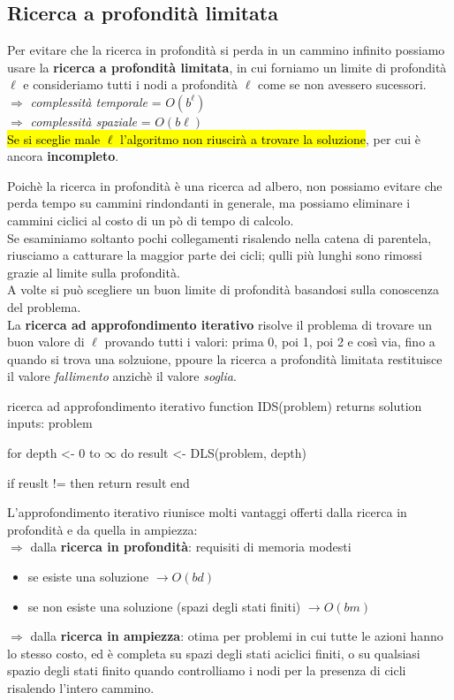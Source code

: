 \documentclass[12pt, a4paper, oneside]{book}
\begin{document}
    \subsection{Ricerca a profondità limitata}
    Per evitare che la ricerca in profondità si perda in un cammino infinito possiamo usare la \textbf{ricerca a profondità limitata}, in cui forniamo un limite di profondità $\ell$ e consideriamo tutti i nodi a profondità $\ell$ come se non avessero sucessori. \\[0.2ex]
    $\Rightarrow$ \textit{complessità temporale} = $O(b^\ell)$ \\[0.2ex]
    $\Rightarrow$ \textit{complessità spaziale} = $O(b\ell)$ \\[0.2ex]
    \hl{Se si sceglie male $\ell$ l'algoritmo non riuscirà a trovare la soluzione}, per cui è ancora \textbf{incompleto}.

    Poichè la ricerca in profondità è una ricerca ad albero, non possiamo evitare che perda tempo su cammini rindondanti in generale, ma possiamo eliminare i cammini ciclici al costo di un pò di tempo di calcolo. \\[0.2ex]
    Se esaminiamo soltanto pochi collegamenti risalendo nella catena di parentela, riusciamo a catturare la maggior parte dei cicli; qulli più lunghi sono rimossi grazie al limite sulla profondità. \\[0.2ex]
    A volte si può scegliere un buon limite di profondità basandosi sulla conoscenza del problema. \\[5ex]

    La \textbf{ricerca ad approfondimento iterativo} risolve il problema di trovare un buon valore di $\ell$ provando tutti i valori: prima 0, poi 1, poi 2 e così via, fino a quando si trova una solzuione, ppoure la ricerca a profondità limitata restituisce il valore \textit{fallimento} anzichè il valore \textit{soglia}.

    \begin{codice}[python]{ricerca ad approfondimento iterativo}
      function IDS(problem) returns solution
        inputs: problem

        for depth <- 0 to $\infty$ do
          result <- DLS(problem, depth)

          if reuslt != then return result
        end
    \end{codice}

    L'approfondimento iterativo riunisce molti vantaggi offerti dalla ricerca in profondità e da quella in ampiezza: \\[0.2ex]
    $\Rightarrow$ dalla \textbf{ricerca in profondità}: requisiti di memoria modesti
    \begin{itemize}
      \item se esiste una soluzione $\rightarrow O(bd)$
      \item se non esiste una soluzione (spazi degli stati finiti) $\rightarrow O(bm)$
    \end{itemize}
    $\Rightarrow$ dalla \textbf{ricerca in ampiezza}: otima per problemi in cui tutte le azioni hanno lo stesso costo, ed è completa su spazi degli stati aciclici finiti, o su qualsiasi spazio degli stati finito quando controlliamo i nodi per la presenza di cicli risalendo l'intero cammino.
\end{document}
